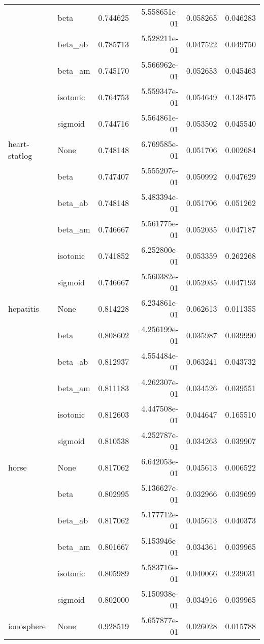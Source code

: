 \begin{tabular}{llrrrr}
        & beta &  0.744625 &  5.558651e-01 &  0.058265 &  0.046283 \\
        & beta\_ab &  0.785713 &  5.528211e-01 &  0.047522 &  0.049750 \\
        & beta\_am &  0.745170 &  5.566962e-01 &  0.052653 &  0.045463 \\
        & isotonic &  0.764753 &  5.559347e-01 &  0.054649 &  0.138475 \\
        & sigmoid &  0.744716 &  5.564861e-01 &  0.053502 &  0.045540 \\
heart-statlog & None &  0.748148 &  6.769585e-01 &  0.051706 &  0.002684 \\
        & beta &  0.747407 &  5.555207e-01 &  0.050992 &  0.047629 \\
        & beta\_ab &  0.748148 &  5.483394e-01 &  0.051706 &  0.051262 \\
        & beta\_am &  0.746667 &  5.561775e-01 &  0.052035 &  0.047187 \\
        & isotonic &  0.741852 &  6.252800e-01 &  0.053359 &  0.262268 \\
        & sigmoid &  0.746667 &  5.560382e-01 &  0.052035 &  0.047193 \\
hepatitis & None &  0.814228 &  6.234861e-01 &  0.062613 &  0.011355 \\
        & beta &  0.808602 &  4.256199e-01 &  0.035987 &  0.039990 \\
        & beta\_ab &  0.812937 &  4.554484e-01 &  0.063241 &  0.043732 \\
        & beta\_am &  0.811183 &  4.262307e-01 &  0.034526 &  0.039551 \\
        & isotonic &  0.812603 &  4.447508e-01 &  0.044647 &  0.165510 \\
        & sigmoid &  0.810538 &  4.252787e-01 &  0.034263 &  0.039907 \\
horse & None &  0.817062 &  6.642053e-01 &  0.045613 &  0.006522 \\
        & beta &  0.802995 &  5.136627e-01 &  0.032966 &  0.039699 \\
        & beta\_ab &  0.817062 &  5.177712e-01 &  0.045613 &  0.040373 \\
        & beta\_am &  0.801667 &  5.153946e-01 &  0.034361 &  0.039965 \\
        & isotonic &  0.805989 &  5.583716e-01 &  0.040066 &  0.239031 \\
        & sigmoid &  0.802000 &  5.150938e-01 &  0.034916 &  0.039965 \\
ionosphere & None &  0.928519 &  5.657877e-01 &  0.026028 &  0.015788 \\

\end{tabular}

